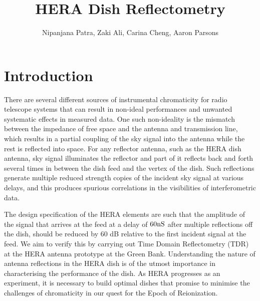 \documentclass[12pt,preprint]{aastex}
\begin{document}
\title{HERA Dish Reflectometry} 
\author{Nipanjana Patra, Zaki Ali, Carina Cheng, Aaron Parsons}
\maketitle

\section{Introduction}



There are several different sources of instrumental chromaticity for radio telescope systems that can result in non-ideal performances and unwanted systematic effects in measured data. One such non-ideality is the mismatch between the impedance of free space and the antenna and transmission line, which results in a partial coupling of the sky signal into the antenna while the rest is reflected into space. For any reflector antenna, such as the HERA dish antenna, sky signal illuminates the reflector and part of it reflects back and forth several times in between the dish feed and the vertex of the dish. Such reflections generate multiple reduced strength copies of the incident sky signal at various delays, and this produces spurious correlations in the visibilities of interferometric data. 

 The design specification of the HERA elements are such that the amplitude of the signal that arrives at the feed at a delay of $60 \rm nS$ after multiple reflections off the dish, should be reduced by 60 dB relative to the first incident signal at the feed. We aim to verify this by carrying out Time Domain Reflectometry (TDR) at the HERA antenna prototype at the Green Bank. Understanding the nature of antenna reflections in the HERA dish is of the
utmost importance in characterising the performance of the dish. As HERA
progresses as an experiment, it is necessary to build optimal dishes that
promise to minimise the challenges of chromaticity in our quest for the Epoch
of Reionization.
\end{document}
